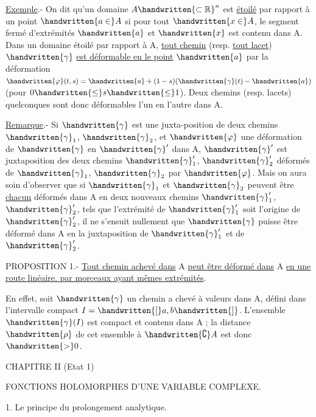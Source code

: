 \uline{Exemple}.- On dit qu'un domaine $A\handwritten{\subset\mathbb{R}}^n$ est \uline{étoilé} par rapport à un point $\handwritten{a\in}A$ si pour tout $\handwritten{x\in}A$, le segment fermé d'extrémités $\handwritten{a}$ et $\handwritten{x}$ est contenu dans A. Dans un domaine étoilé par rapport à A, \uline{tout chemin} (resp. \uline{tout lacet}) $\handwritten{\gamma}$ \uline{est déformable en le point} $\handwritten{a}$ par la déformation $\handwritten{\varphi}(t,s)=\handwritten{a}+(1-s)(\handwritten{\gamma}(t)-\handwritten{a})$ (pour $0\handwritten{\leq}s\handwritten{\leq}1$). Deux chemins (resp. lacets) quelconques sont donc déformables l'un en l'autre dans A.

\uline{Remarque}.- Si $\handwritten{\gamma}$ est une juxta-position de deux chemins $\handwritten{\gamma}_1$, $\handwritten{\gamma}_2$, et $\handwritten{\varphi}$ une déformation de $\handwritten{\gamma}$ en $\handwritten{\gamma}'$ dans A, $\handwritten{\gamma}'$ est juxtaposition des deux chemins $\handwritten{\gamma}'_1$, $\handwritten{\gamma}'_2$ déformés de $\handwritten{\gamma}_1$, $\handwritten{\gamma}_2$ par $\handwritten{\varphi}$. Mais on aura soin d'observer que si $\handwritten{\gamma}_1$ et $\handwritten{\gamma}_2$ peuvent être \uline{chacun} déformés dans A en deux nouveaux chemins $\handwritten{\gamma}'_1$, $\handwritten{\gamma}'_2$, tels que l'extrémité de $\handwritten{\gamma}'_1$ soit l'origine de $\handwritten{\gamma}'_2$, il ne s'ensuit nullement que $\handwritten{\gamma}$ puisse être déformé dans A en la juxtaposition de $\handwritten{\gamma}'_1$ et de $\handwritten{\gamma}'_2$.

PROPOSITION 1.- \uline{Tout chemin achevé dans} A \uline{peut être déformé dans} A \uline{en une route linéaire. par morceaux ayant mêmes extrémités}.

En effet, soit $\handwritten{\gamma}$ un chemin a chevé à valeurs dans A, défini dans l'intervalle compact $I=\handwritten{[}a,b\handwritten{]}$. L'ensemble $\handwritten{\gamma}(I)$ est compact et contenu dans A ; la distance $\handwritten{\rho}$ de cet ensemble à $\handwritten{\complement}A$ est donc $\handwritten{>}0$.

\begin{center}
CHAPITRE II (Etat 1)

FONCTIONS HOLOMORPHES D'UNE VARIABLE COMPLEXE.

\handwritten{\S}1. Le principe du prolongement analytique.
\end{center}

